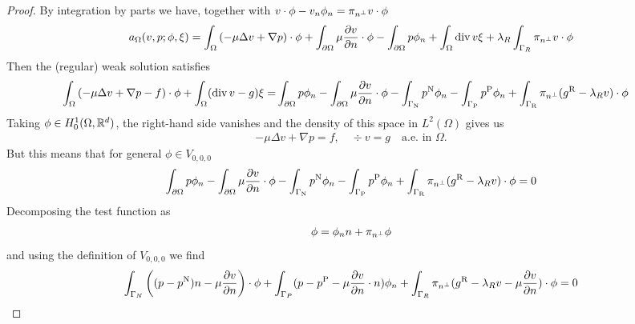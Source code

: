 \begin{proof}
By integration by parts we have, together with $v\cdot\phi - v_n\phi_n=\pi_{n^{\perp}} v\cdot\phi$
%
\begin{align*}
a_{\Omega}(v,p; \phi,\xi) = \int_{\Omega} \left( -\mu \Delta v+\nabla p\right)\cdot\phi + 
\int_{\partial\Omega} \mu\frac{\partial v}{\partial n}\cdot\phi - \int_{\partial\Omega} p\phi_n
+\int_{\Omega} \operatorname{div} v \xi+ \lambda_R\int_{\Gamma_R}\pi_{n^{\perp}} v\cdot\phi
\end{align*}
%
Then the (regular) weak solution satisfies
%
\begin{align*}
\int_{\Omega} \left( -\mu \Delta v+\nabla p -f\right)\cdot\phi +\int_{\Omega} (\operatorname{div} v-g) \xi
=& \int_{\partial\Omega} p\phi_n - \int_{\partial\Omega} \mu\frac{\partial v}{\partial n}\cdot\phi -\int_{\Gamma_{\rm N}} p^{\rm N}\phi_n-\int_{\Gamma_{\rm P}} p^{\rm P}\phi_n+ \int_{\Gamma_{\rm R}} \pi_{n^{\perp}}(g^{\rm R} -\lambda_R v)\cdot\phi
\end{align*}
%
Taking $\phi \in H^1_0(\Omega,\mathbb R^d)$, the right-hand side vanishes and the density of this space in $L^2(\Omega)$ gives us 
%
\begin{align*}
-\mu \Delta v+\nabla p = f,\quad \div v = g \quad  \mbox{a.e. in $\Omega$}.
\end{align*}
%
But this means that for general $\phi\in V_{0,0,0}$
%
\begin{align*}
\int_{\partial\Omega} p\phi_n - \int_{\partial\Omega} \mu\frac{\partial v}{\partial n}\cdot\phi -\int_{\Gamma_{\rm N}} p^{\rm N}\phi_n -\int_{\Gamma_{\rm P}} p^{\rm P}\phi_n
+ \int_{\Gamma_{\rm R}} \pi_{n^{\perp}}(g^{\rm R} -\lambda_R v)\cdot\phi=0
\end{align*}
%
Decomposing the test function as
%
\begin{align*}
\phi = \phi_n n + \pi_{n^{\perp}}\phi
\end{align*}
%
and using the definition of $V_{0,0,0}$ we find
%
\begin{align*}
\int_{\Gamma_N} \left( (p-p^{\rm N})n - \mu\frac{\partial v}{\partial n}\right)\cdot\phi 
+ \int_{\Gamma_P}  (p-p^{\rm P}- \mu\frac{\partial v}{\partial n}\cdot n)\phi_n 
+ \int_{\Gamma_R} \pi_{n^{\perp}}(g^{\rm R} -\lambda_R v - \mu\frac{\partial v}{\partial n})\cdot\phi =0
\end{align*}
%
\end{proof}
%
